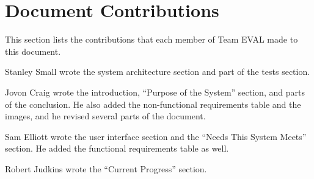 \documentclass{article}
\begin{document}
\newpage
\section{Document Contributions}

This section lists the contributions that each member of Team EVAL made to this document.

\medskip

Stanley Small wrote the system architecture section and part of the tests section.

Jovon Craig wrote the introduction, ``Purpose of the System'' section, and parts of the conclusion. He also added the non-functional requirements table and the images, and he revised several parts of the document.

Sam Elliott wrote the user interface section and the ``Needs This System Meets'' section. He added the functional requirements table as well.

Robert Judkins wrote the ``Current Progress'' section.

\newpage




\newpage



\end{document}
